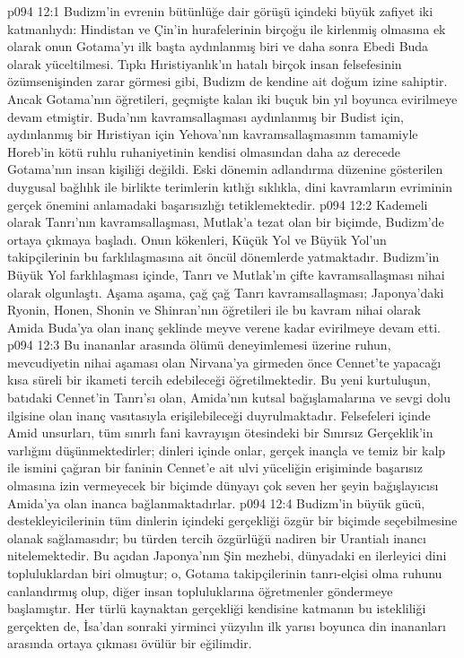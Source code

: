 \vs p094 12:1 Budizm’in evrenin bütünlüğe dair görüşü içindeki büyük zafiyet iki katmanlıydı: Hindistan ve Çin’in hurafelerinin birçoğu ile kirlenmiş olmasına ek olarak onun Gotama’yı ilk başta aydınlanmış biri ve daha sonra Ebedi Buda olarak yüceltilmesi. Tıpkı Hıristiyanlık’ın hatalı birçok insan felsefesinin özümsenişinden zarar görmesi gibi, Budizm de kendine ait doğum izine sahiptir. Ancak Gotama’nın öğretileri, geçmişte kalan iki buçuk bin yıl boyunca evirilmeye devam etmiştir. Buda’nın kavramsallaşması aydınlanmış bir Budist için, aydınlanmış bir Hıristiyan için Yehova’nın kavramsallaşmasının tamamiyle Horeb’in kötü ruhlu ruhaniyetinin kendisi olmasından daha az derecede Gotama’nın insan kişiliği değildi. Eski dönemin adlandırma düzenine gösterilen duygusal bağlılık ile birlikte terimlerin kıtlığı sıklıkla, dini kavramların evriminin gerçek önemini anlamadaki başarısızlığı tetiklemektedir.
\vs p094 12:2 Kademeli olarak Tanrı’nın kavramsallaşması, Mutlak’a tezat olan bir biçimde, Budizm’de ortaya çıkmaya başladı. Onun kökenleri, Küçük Yol ve Büyük Yol’un takipçilerinin bu farklılaşmasına ait öncül dönemlerde yatmaktadır. Budizm’in Büyük Yol farklılaşması içinde, Tanrı ve Mutlak’ın çifte kavramsallaşması nihai olarak olgunlaştı. Aşama aşama, çağ çağ Tanrı kavramsallaşması; Japonya’daki Ryonin, Honen, Shonin ve Shinran’nın öğretileri ile bu kavram nihai olarak Amida Buda’ya olan inanç şeklinde meyve verene kadar evirilmeye devam etti.
\vs p094 12:3 Bu inananlar arasında ölümü deneyimlemesi üzerine ruhun, mevcudiyetin nihai aşaması olan Nirvana’ya girmeden önce Cennet’te yapacağı kısa süreli bir ikameti tercih edebileceği öğretilmektedir. Bu yeni kurtuluşun, batıdaki Cennet’in Tanrı’sı olan, Amida’nın kutsal bağışlamalarına ve sevgi dolu ilgisine olan inanç vasıtasıyla erişilebileceği duyrulmaktadır. Felsefeleri içinde Amid unsurları, tüm sınırlı fani kavrayışın ötesindeki bir Sınırsız Gerçeklik’in varlığını düşünmektedirler; dinleri içinde onlar, gerçek inançla ve temiz bir kalp ile ismini çağıran bir faninin Cennet’e ait ulvi yüceliğin erişiminde başarısız olmasına izin vermeyecek bir biçimde dünyayı çok seven her şeyin bağışlayıcısı Amida’ya olan inanca bağlanmaktadırlar.
\vs p094 12:4 Budizm’in büyük gücü, destekleyicilerinin tüm dinlerin içindeki gerçekliği özgür bir biçimde seçebilmesine olanak sağlamasıdır; bu türden tercih özgürlüğü nadiren bir Urantialı inancı nitelemektedir. Bu açıdan Japonya’nın Şin mezhebi, dünyadaki en ilerleyici dini topluluklardan biri olmuştur; o, Gotama takipçilerinin tanrı\hyp{}elçisi olma ruhunu canlandırmış olup, diğer insan topluluklarına öğretmenler göndermeye başlamıştır. Her türlü kaynaktan gerçekliği kendisine katmanın bu istekliliği gerçekten de, İsa’dan sonraki yirminci yüzyılın ilk yarısı boyunca din inananları arasında ortaya çıkması övülür bir eğilimdir.
